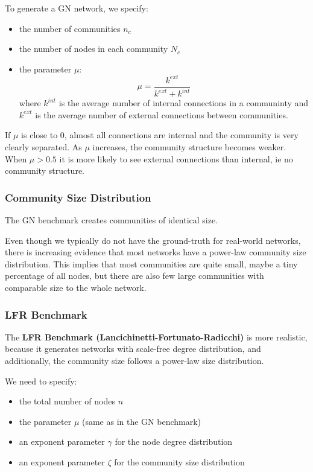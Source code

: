 \documentclass[11pt]{scrartcl} %
\begin{document}
To generate a GN network, we specify:
\begin{itemize}
	\item the number of communities $n_c$ 
	\item the number of nodes in each community $N_c$
	\item the parameter $\mu$: \[ \mu = \frac{k^{ext}}{k^{ext}+k^{int}}\] where $k^{int}$ is the average number of internal connections in a communinty and $k^{ext}$ is the average number of external connections between communities.
\end{itemize}
If $\mu$ is close to 0, almost all connections are internal and the community is very clearly separated. As $\mu$ increases, the community structure becomes weaker. When $\mu>0.5$ it is more likely to see external connections than internal, ie no community structure.

\subsubsection{Community Size Distribution}
The GN benchmark creates communities of identical size. 

Even though we typically do not have the ground-truth for real-world networks, there is increasing evidence that most networks have a power-law community size distribution. This implies that most communities are quite small, maybe a tiny percentage of all nodes, but there are also few large communities with comparable size to the whole network. 

\subsubsection{LFR Benchmark}
The \textbf{LFR Benchmark (Lancichinetti-Fortunato-Radicchi)} is more realistic, because it generates networks with scale-free degree distribution, and additionally, the community size follows a power-law size distribution.  

We need to specify:
\begin{itemize}
	\item the total number of nodes $n$
	\item the parameter $\mu$ (same as in the GN benchmark)
	\item an exponent parameter $\gamma$ for the node degree distribution
	\item an exponent parameter $\zeta$ for the community size distribution
\end{itemize}
\end{document}
